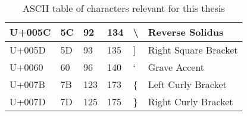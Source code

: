 \begin{table}
\begin{tabular}{| l | l | l | l | l | l |}
    U+005C  & 5C  & 92  & 134 & \textbackslash	  & Reverse Solidus \\ \hline	
    U+005D  & 5D  & 93  & 135 & ]	  & Right Square Bracket \\ \hline
    U+0060  & 60  & 96  & 140 & `	  & Grave Accent \\ \hline
    U+007B  & 7B  & 123 & 173 & \{	  & Left Curly Bracket \\ \hline
    U+007D  & 7D  & 125 & 175 & \}	  & Right Curly Bracket \\ \hline
    \end{tabular}
    \caption{ASCII table of characters relevant for this thesis}
\end{table}
